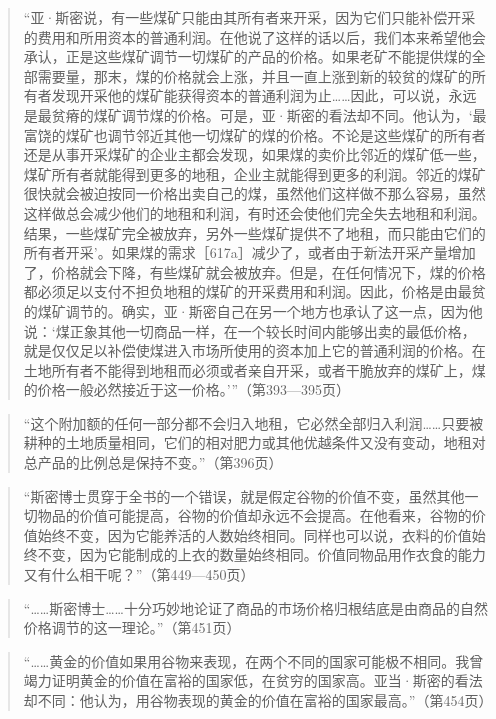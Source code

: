 \begin{quote}“亚·斯密说，有一些煤矿只能由其所有者来开采，因为它们只能补偿开采的费用和所用资本的普通利润。在他说了这样的话以后，我们本来希望他会承认，正是这些煤矿调节一切煤矿的产品的价格。如果老矿不能提供煤的全部需要量，那末，煤的价格就会上涨，并且一直上涨到新的较贫的煤矿的所有者发现开采他的煤矿能获得资本的普通利润为止……因此，可以说，永远是最贫瘠的煤矿调节煤的价格。可是，亚·斯密的看法却不同。他认为，‘最富饶的煤矿也调节邻近其他一切煤矿的煤的价格。不论是这些煤矿的所有者还是从事开采煤矿的企业主都会发现，如果煤的卖价比邻近的煤矿低一些，煤矿所有者就能得到更多的地租，企业主就能得到更多的利润。邻近的煤矿很快就会被迫按同一价格出卖自己的煤，虽然他们这样做不那么容易，虽然这样做总会减少他们的地租和利润，有时还会使他们完全失去地租和利润。结果，一些煤矿完全被放弃，另外一些煤矿提供不了地租，而只能由它们的所有者开采’。如果煤的需求［617a］减少了，或者由于新法开采产量增加了，价格就会下降，有些煤矿就会被放弃。但是，在任何情况下，煤的价格都必须足以支付不担负地租的煤矿的开采费用和利润。因此，价格是由最贫的煤矿调节的。确实，亚·斯密自己在另一个地方也承认了这一点，因为他说：‘煤正象其他一切商品一样，在一个较长时间内能够出卖的最低价格，就是仅仅足以补偿使煤进入市场所使用的资本加上它的普通利润的价格。在土地所有者不能得到地租而必须或者亲自开采，或者干脆放弃的煤矿上，煤的价格一般必然接近于这一价格。’”（第393—395页）\end{quote}

\begin{quote}“这个附加额的任何一部分都不会归入地租，它必然全部归入利润……只要被耕种的土地质量相同，它们的相对肥力或其他优越条件又没有变动，地租对总产品的比例总是保持不变。”（第396页）\end{quote}

\begin{quote}“斯密博士贯穿于全书的一个错误，就是假定谷物的价值不变，虽然其他一切物品的价值可能提高，谷物的价值却永远不会提高。在他看来，谷物的价值始终不变，因为它能养活的人数始终相同。同样也可以说，衣料的价值始终不变，因为它能制成的上衣的数量始终相同。价值同物品用作衣食的能力又有什么相干呢？”（第449—450页）\end{quote}

\begin{quote}“……斯密博士……十分巧妙地论证了商品的市场价格归根结底是由商品的自然价格调节的这一理论。”（第451页）\end{quote}

\begin{quote}“……黄金的价值如果用谷物来表现，在两个不同的国家可能极不相同。我曾竭力证明黄金的价值在富裕的国家低，在贫穷的国家高。亚当·斯密的看法却不同：他认为，用谷物表现的黄金的价值在富裕的国家最高。”（第454页）\end{quote}

